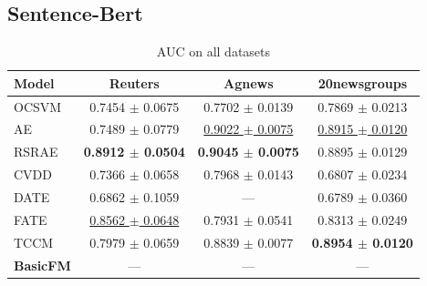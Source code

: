 \subsection {Sentence-Bert}

\begin{table}[H]
\centering
\caption{AUC on all datasets}
\begin{tabular}{lccc}
\toprule
Model & Reuters & Agnews & 20newsgroups \\
\midrule
OCSVM & 0.7454 $\pm$ 0.0675 & 0.7702 $\pm$ 0.0139 & 0.7869 $\pm$ 0.0213 \\
AE & 0.7489 $\pm$ 0.0779 & \underline{0.9022 $\pm$ 0.0075} & \underline{0.8915 $\pm$ 0.0120} \\
\midrule
RSRAE & \textbf{0.8912 $\pm$ 0.0504} & \textbf{0.9045 $\pm$ 0.0075} & 0.8895 $\pm$ 0.0129 \\
CVDD & 0.7366 $\pm$ 0.0658 & 0.7968 $\pm$ 0.0143 & 0.6807 $\pm$ 0.0234 \\
DATE & 0.6862 $\pm$ 0.1059 & — & 0.6789 $\pm$ 0.0360 \\
FATE & \underline{0.8562 $\pm$ 0.0648} & 0.7931 $\pm$ 0.0541 & 0.8313 $\pm$ 0.0249 \\
\midrule
TCCM & 0.7979 $\pm$ 0.0659 & 0.8839 $\pm$ 0.0077 & \textbf{0.8954 $\pm$ 0.0120} \\
\textbf{BasicFM} & — & — & — \\
\bottomrule
\end{tabular}
\label{tab:global}
\end{table}


